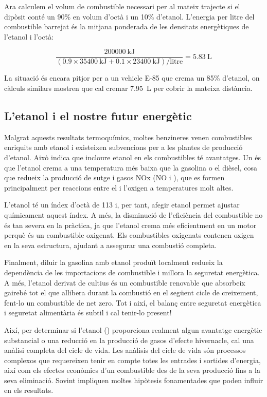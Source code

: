 Ara calculem el volum de combustible necessari per al mateix trajecte si el dipòsit conté un 90\% en volum d'octà i un 10\% d'etanol. L'energia per litre del combustible barrejat és la mitjana ponderada de les densitats energètiques de l'etanol i l'octà:

\begin{equation*}
\frac{\qty{200000}{\kilo\joule}}{(0.9 \times \qty{35400}{\kilo\joule} + 0.1 \times \qty{23400}{\kilo\joule})/\text{litre}} = \qty{5.83}{\liter}
\end{equation*}

La situació és encara pitjor per a un vehicle E-85 que crema un 85\% d'etanol, on càlculs similars mostren que cal cremar \qty{7.95}{\liter} per cobrir la mateixa distància.

\subsection{L'etanol i el nostre futur energètic}

Malgrat aquests resultats termoquímics, moltes benzineres venen combustibles enriquits amb etanol i existeixen subvencions per a les plantes de producció d'etanol. Això indica que incloure etanol en els combustibles té avantatges. Un és que l'etanol crema a una temperatura més baixa que la gasolina o el dièsel, cosa que redueix la producció de sutge i gasos NOx (NO i ), que es formen principalment per reaccions entre el  i l'oxigen a temperatures molt altes.

L'etanol té un índex d'octà de 113 i, per tant, afegir etanol permet ajustar químicament aquest índex. A més, la disminució de l'eficiència del combustible no és tan severa en la pràctica, ja que l'etanol crema més eficientment en un motor perquè és un combustible oxigenat. Els combustibles oxigenats contenen oxigen en la seva estructura, ajudant a assegurar una combustió completa.

Finalment, diluir la gasolina amb etanol produït localment redueix la dependència de les importacions de combustible i millora la seguretat energètica. A més, l'etanol derivat de cultius és un combustible renovable que absorbeix gairebé tot el  que allibera durant la combustió en el següent cicle de creixement, fent-lo un combustible de  net zero. Tot i així, el balanç entre seguretat energètica i seguretat alimentària és subtil i cal tenir-lo present!

Així, per determinar si l'etanol () proporciona realment algun avantatge energètic substancial o una reducció en la producció de gasos d'efecte hivernacle, cal una anàlisi completa del cicle de vida. Les anàlisis del cicle de vida són processos complexos que requereixen tenir en compte totes les entrades i sortides d'energia, així com els efectes econòmics d'un combustible des de la seva producció fins a la seva eliminació. Sovint impliquen moltes hipòtesis fonamentades que poden influir en els resultats.  

